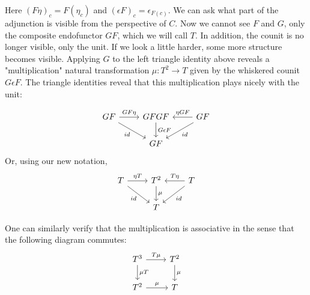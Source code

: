 Here $(F\eta)_c=F(\eta_c)$ and $(\epsilon F)_c=\epsilon_{F(c)}$. We can ask what part of the adjunction is visible from the perspective of $C$. Now we cannot see $F$ and $G$, only the composite endofunctor $GF$, which we will call $T$. In addition, the counit is no longer visible, only the unit. If we look a little harder, some more structure becomes visible. Applying $G$ to the left triangle identity above reveals a "multiplication" natural transformation $\mu:T^2\rightarrow T$ given by the whiskered counit $G\epsilon F$. The triangle identities reveal that this multiplication plays nicely with the unit:

\[\begin{tikzcd}
GF \arrow[rd, "id"'] \arrow[r, "GF\eta"] & GFGF \arrow[d, "G\epsilon F"] & GF \arrow[ld, "id"] \arrow[l, "\eta GF"'] \\
                                         & GF                            &                                          
\end{tikzcd}\]
Or, using our new notation,
\[\begin{tikzcd}
T \arrow[rd, "id"'] \arrow[r, "\eta T"] & T^2 \arrow[d, "\mu"] & T \arrow[ld, "id"] \arrow[l, "T\eta"'] \\
                                        & T                    &                                       
\end{tikzcd}\]

One can similarly verify that the multiplication is associative in the sense that the following diagram commutes:
\[\begin{tikzcd}
T^3 \arrow[r, "T\mu"] \arrow[d, "\mu T"] & T^2 \arrow[d, "\mu"] \\
T^2 \arrow[r, "\mu"]                     & T                   
\end{tikzcd}\]

